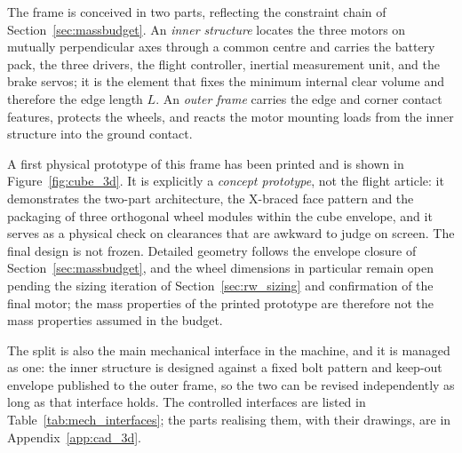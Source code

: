 The frame is conceived in two parts, reflecting the constraint chain of
Section~\ref{sec:massbudget}. An \emph{inner structure} locates the three motors
on mutually perpendicular axes through a common centre and carries the battery
pack, the three drivers, the flight controller, inertial measurement unit, and the brake servos; it is the
element that fixes the minimum internal clear volume and therefore the edge
length $L$. An \emph{outer frame} carries the edge and corner contact features,
protects the wheels, and reacts the motor mounting loads from the inner
structure into the ground contact.

A first physical prototype of this frame has been printed and is shown in
Figure~\ref{fig:cube_3d}. It is explicitly a \emph{concept prototype}, not the
flight article: it demonstrates the two-part architecture, the X-braced face
pattern and the packaging of three orthogonal wheel modules within the cube
envelope, and it serves as a physical check on clearances that are awkward to
judge on screen. The final design is not frozen. Detailed geometry follows the
envelope closure of Section~\ref{sec:massbudget}, and the wheel dimensions in
particular remain open pending the sizing iteration of
Section~\ref{sec:rw_sizing} and confirmation of the final motor; the mass
properties of the printed prototype are therefore not the mass properties
assumed in the budget.

The split is also the main mechanical interface in the machine, and it is
managed as one: the inner structure is designed against a fixed bolt pattern and
keep-out envelope published to the outer frame, so the two can be revised
independently as long as that interface holds. The controlled interfaces are
listed in Table~\ref{tab:mech_interfaces}; the parts realising them, with their
drawings, are in Appendix~\ref{app:cad_3d}.

